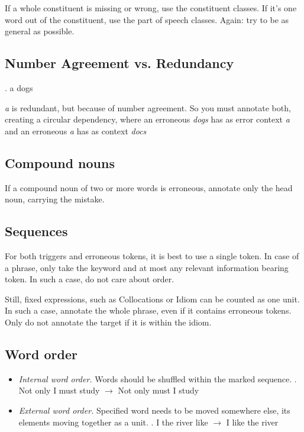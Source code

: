 \documentclass{article}
\begin{document}
If a whole constituent is missing or wrong, use the constituent classes. If it's
one word out of the constituent, use the part of speech classes. Again: try to
be as general as possible.

\subsection{Number Agreement vs. Redundancy}

\ex. a dogs

\textit{a} is redundant, but because of number agreement. So you must annotate both,
creating a circular dependency, where an erroneous \textit{dogs} has as error
context \textit{a} and an erroneous \textit{a} has as context \textit{docs}

\subsection{Compound nouns}

If a compound noun of two or more words is erroneous, annotate only the head noun, carrying the mistake.

\subsection{Sequences}
For both triggers and erroneous tokens, it is best to use a single token. In
case of a phrase, only take the keyword and at most any relevant information
bearing token. In such a case, do not care about order.

Still, fixed expressions, such as  Collocations or Idiom can be counted as one
unit. In such a case, annotate the whole phrase, even if it contains erroneous
tokens. Only do not annotate the target if it is within the idiom.


\subsection{Word order}
\begin{itemize}
\item \textit{Internal word order.} Words should be shuffled within the marked sequence. 
\ex. Not only I must study $\to$ Not only must I study

\item \textit{External word order.} Specified word needs to be moved somewhere
else, its elements moving together as a unit.
\ex. I the river like $\to$ I like the river

\end{itemize}
\end{document}
